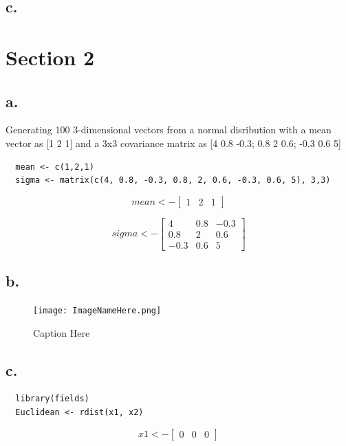 \documentclass{report}
\begin{document}
\section{c.}

\chapter{Section 2}

\section{a.}

Generating 100 3-dimensional vectors from a normal disribution with a mean vector as [1 2 1] and a 3x3 covariance matrix as [4  0.8 -0.3; 0.8 2 0.6; -0.3 0.6 5]

\begin{verbatim}
  mean <- c(1,2,1)
  sigma <- matrix(c(4, 0.8, -0.3, 0.8, 2, 0.6, -0.3, 0.6, 5), 3,3)
\end{verbatim}

\[
  mean <-
  \begin{bmatrix}
    1 & 2 & 1
  \end{bmatrix}
\]

\[
  sigma <-
  \begin{bmatrix}
    4 & 0.8 & -0.3 \\
    0.8 & 2 & 0.6 \\
    -0.3 & 0.6 & 5
  \end{bmatrix}
\]

\section{b.}

\begin{figure}[H]
  \texttt{[image: ImageNameHere.png]}
  \caption{Caption Here}
  \label{fig:LabelHere}
\end{figure}

\section{c.}

\begin{verbatim}
  library(fields)
  Euclidean <- rdist(x1, x2)
\end{verbatim}

\[
  x1 <-
  \begin{bmatrix}
    0 & 0 & 0
  \end{bmatrix}
\]
\end{document}
